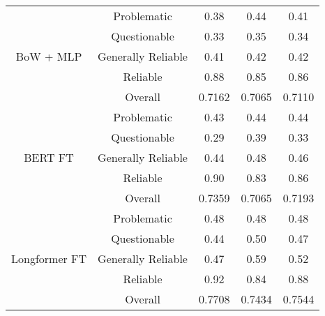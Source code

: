 \begin{table}[htbp]
\begin{tabular}{| c | c | c | c | c |}
        \multirow{5}{*}{BoW + MLP}                         & Problematic        & 0.38               & 0.44            & 0.41            \\
                                                           & Questionable       & 0.33               & 0.35            & 0.34            \\
                                                           & Generally Reliable & 0.41               & 0.42            & 0.42            \\
                                                           & Reliable           & 0.88               & 0.85            & 0.86            \\\cline{2-5}
                                                           & Overall            & 0.7162             & 0.7065          & 0.7110          \\
        \hline
        \multirow{5}{*}{BERT FT}                           & Problematic        & 0.43               & 0.44            & 0.44            \\
                                                           & Questionable       & 0.29               & 0.39            & 0.33            \\
                                                           & Generally Reliable & 0.44               & 0.48            & 0.46            \\
                                                           & Reliable           & 0.90               & 0.83            & 0.86            \\\cline{2-5}
                                                           & Overall            & 0.7359             & 0.7065          & 0.7193          \\
        \hline
        \multirow{5}{*}{Longformer FT}                     & Problematic        & 0.48               & 0.48            & 0.48            \\
                                                           & Questionable       & 0.44               & 0.50            & 0.47            \\
                                                           & Generally Reliable & 0.47               & 0.59            & 0.52            \\
                                                           & Reliable           & 0.92               & 0.84            & 0.88            \\\cline{2-5}
                                                           & Overall            & 0.7708             & 0.7434          & 0.7544          \\

\end{tabular}
\end{table}
